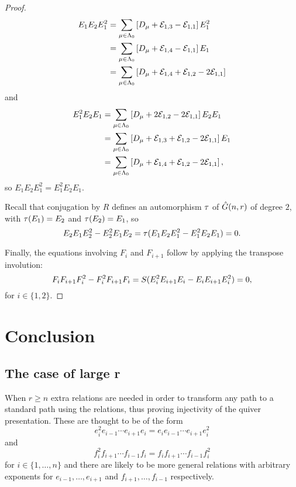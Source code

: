 \documentclass[a4paper, 11pt]{report}
\begin{document}
\begin{proof}
\begin{align*}
E_1E_2E_1^2 &= \sum_{\mu\in\Lambda_0{}} \left[D_{\mu}+\mathcal{E}_{1,3}-\mathcal{E}_{1,1}\right]E_1^2\\
&= \sum_{\mu\in\Lambda_0{}} \left[D_{\mu}+\mathcal{E}_{1,4}-\mathcal{E}_{1,1}\right]E_1\\
&= \sum_{\mu\in\Lambda_0{}} \left[D_{\mu}+\mathcal{E}_{1,4}+\mathcal{E}_{1,2}-2\mathcal{E}_{1,1}\right]
\end{align*}
and
\begin{align*}
E_1^2E_2E_1 &= \sum_{\mu\in\Lambda_0{}} \left[D_{\mu}+2\mathcal{E}_{1,2}-2\mathcal{E}_{1,1}\right]E_2E_1\\
&= \sum_{\mu\in\Lambda_0{}} \left[D_{\mu}+\mathcal{E}_{1,3}+\mathcal{E}_{1,2}-2\mathcal{E}_{1,1}\right]E_1\\
&= \sum_{\mu\in\Lambda_0{}} \left[D_{\mu}+\mathcal{E}_{1,4}+\mathcal{E}_{1,2}-2\mathcal{E}_{1,1}\right],
\end{align*}
so $E_1E_2E_1^2 = E_1^2E_2E_1$.

Recall that conjugation by $R$ defines an automorphism $\tau{}$ of $\hat{G}(n,r)$ of degree $2$, with $\tau{(E_1)}=E_2$ and $\tau{(E_2)}=E_1$, so
\begin{equation*}
E_2E_1E_2^2 - E_2^2E_1E_2 = \tau{(E_1E_2E_1^2-E_1^2E_2E_1)} = 0.
\end{equation*}

Finally, the equations involving $F_i$ and $F_{i+1}$ follow by applying the transpose involution:
\begin{equation*}
F_iF_{i+1}F_i^2 - F_i^2F_{i+1}F_i = S{(E_i^2E_{i+1}E_i-E_iE_{i+1}E_i^2)} = 0,
\end{equation*}
for $i\in\{1,2\}$.
\end{proof}



\chapter{Conclusion}

\section{The case of large r}

When $r\geq n$ extra relations are needed in order to transform any path to a standard path using the relations, thus proving injectivity of the quiver presentation. These are thought to be of the form
\begin{equation*}
e_i^2e_{i-1}\cdots e_{i+1}e_i = e_ie_{i-1}\cdots e_{i+1}e_i^2
\end{equation*}
and
\begin{equation*}
f_i^2f_{i+1}\cdots f_{i-1}f_i = f_if_{i+1}\cdots f_{i-1}f_i^2
\end{equation*}
for $i\in\{1,\ldots,n\}$ and there are likely to be more general relations with arbitrary exponents for $e_{i-1},\ldots,e_{i+1}$ and $f_{i+1},\ldots,f_{i-1}$ respectively.
\end{document}
